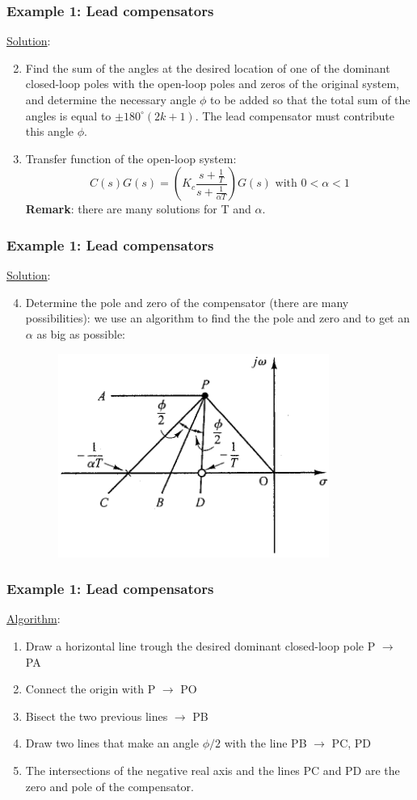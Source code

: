 \begin{frame}
	\frametitle{Example 1: Lead compensators}
	\underline{Solution}:
	\begin{enumerate}
		\setcounter{enumi}{1}
		\item  Find the sum of the angles at the desired location of one of the dominant closed-loop poles with the open-loop poles and zeros of the original system, and determine the necessary angle $\phi$ to be added so that the total sum of the angles is equal to $\pm 180^{\circ}(2k + 1)$. The lead compensator must contribute this angle $\phi$.
		\item Transfer function of the open-loop system: $$C(s)G(s)=(K_c\frac{s+\frac{1}{T}}{s+\frac{1}{\alpha T}})G(s) \text{ with } 0<\alpha<1$$
		\textbf{Remark}: there are many solutions for T and $\alpha$. 
	\end{enumerate}
\end{frame}

\begin{frame}
	\frametitle{Example 1: Lead compensators}
	\underline{Solution}:
	\begin{enumerate}
		\setcounter{enumi}{3}
		\item Determine the pole and zero of the compensator (there are many possibilities): we use an algorithm to find the the pole and zero and to get an $\alpha$ as big as possible:
		\begin{figure}
			\centering
			\includegraphics[width=0.6\linewidth]{Ex1_draw_algoritme}
		\end{figure}
	\end{enumerate}
\end{frame}

\begin{frame}
	\frametitle{Example 1: Lead compensators}
	\underline{Algorithm}:
	\begin{enumerate}
		\item Draw a horizontal line trough the desired dominant closed-loop pole P $\rightarrow$ PA
		\item Connect the origin with P $\rightarrow$ PO
		\item Bisect the two previous lines $\rightarrow$ PB
		\item Draw two lines that make an angle $\phi/2$ with the line PB $\rightarrow$ PC, PD
		\item The intersections of the negative real axis and the lines PC and PD are the zero and pole of the compensator. 
	\end{enumerate}
\end{frame}

